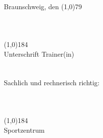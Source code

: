 \documentclass[10pt,a4paper]{scrartcl}
\newcommand{\squeezeup}{\vspace{-2.5mm}}
\begin{document}
\begin{minipage}{0.40\textwidth}
{\large Braunschweig, den \line(1,0){79}}\\\\\\\\
\line(1,0){184}\\
\squeezeup
{\large Unterschrift Trainer(in)} \\\\\\
{\large Sachlich und rechnerisch richtig:}\\\\\\\\
\line(1,0){184}\\
\squeezeup
{\large Sportzentrum }
\end{minipage}
\begin{minipage}{0.03\textwidth}
\begin{tabularx}{\textwidth}{c}
\end{tabularx}
\end{minipage}
\end{document}
